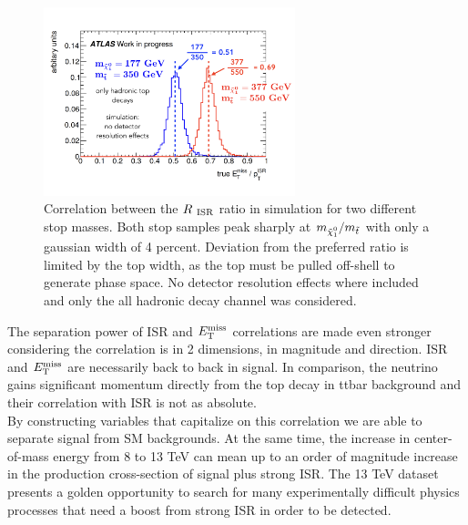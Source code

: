 \begin{figure}[h!]
  \centering
	\includegraphics[width=0.65\textwidth]{./figures/strategy/RISR_truth.png}
\caption{Correlation between the $R_{~\mathrm{ISR}}$ ratio in simulation for two different stop masses.  Both stop samples peak sharply at $m_{\ninoone}/m_{\stop}$ with only a gaussian width of 4 percent.  Deviation from the preferred ratio is limited by the top width, as the top must be pulled off-shell to generate phase space. No detector resolution effects where included and only the all hadronic decay channel was considered.}
\label{fig:stop_400_227_ISR_MET_truth}
\end{figure}

\indent The separation power of ISR and $E_{\mathrm{T}}^{\mathrm{miss}}$ correlations are made even stronger considering the correlation is in 2 dimensions, in magnitude and direction.  ISR and $E_{\mathrm{T}}^{\mathrm{miss}}$ are necessarily back to back in signal.  In comparison, the neutrino gains significant momentum directly from the top decay in ttbar background and their correlation with ISR is not as absolute.  \\

\indent By constructing variables that capitalize on this correlation we are able to separate signal from SM backgrounds.  At the same time, the increase in center-of-mass energy from 8 to 13 TeV can mean up to an order of magnitude increase in the production cross-section of signal plus strong ISR.  The 13 TeV dataset presents a golden opportunity to search for many experimentally difficult physics processes that need a boost from strong ISR in order to be detected. \\